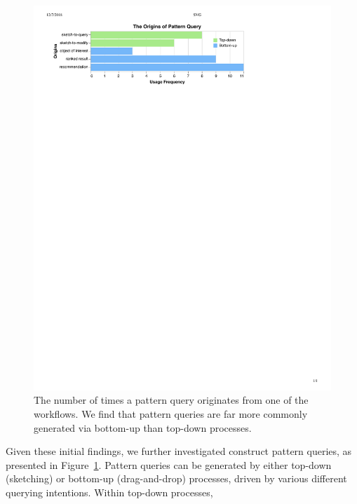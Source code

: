  \begin{figure}[h!]
   \includegraphics[width=0.95\linewidth]{figures/the_origins_of_sketch.pdf}
   \vspace{-5pt}
   \caption{The number of times a pattern query originates from one of the workflows. We find that pattern queries are far more commonly generated via bottom-up than top-down processes.}\label{fig:origins_of_sketch}
   \vspace{-5pt}
 \end{figure}
 \par Given these initial findings,
 we further investigated  construct pattern queries, as presented in Figure~\ref{fig:origins_of_sketch}.
 Pattern queries can be generated by
 either top-down (sketching) or
 bottom-up (drag-and-drop) processes,
 driven by various different querying intentions.  Within top-down processes,
